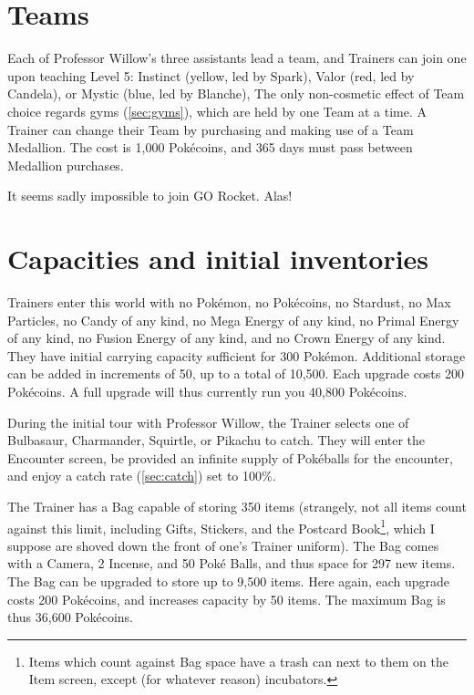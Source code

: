 \section{Teams}
Each of Professor Willow's three assistants lead a team, and Trainers can join one
 upon teaching Level 5: Instinct (yellow, led by Spark),
  Valor (red, led by Candela),
  or Mystic (blue, led by Blanche),
The only non-cosmetic effect of Team choice regards gyms (\autoref{sec:gyms}), which
  are held by one Team at a time.
A Trainer can change their Team by purchasing and making use of a Team Medallion.
The cost is 1,000 Pokécoins, and 365 days must pass between Medallion purchases.

It seems sadly impossible to join GO Rocket. Alas!

\section{Capacities and initial inventories\label{sec:capacities}}
Trainers enter this world with no Pokémon, no Pokécoins, no Stardust,
  no Max Particles, no Candy of any kind, no Mega Energy of any kind,
  no Primal Energy of any kind, no Fusion Energy of any kind, and no Crown
  Energy of any kind.
They have initial carrying capacity sufficient for 300 Pokémon.
Additional storage can be added in increments of 50, up to a total of 10,500.
Each upgrade costs 200 Pokécoins.
A full upgrade will thus currently run you 40,800 Pokécoins.

During the initial tour with Professor Willow, the Trainer selects one of
 Bulbasaur, Charmander, Squirtle, or Pikachu to catch.
They will enter the Encounter screen, be provided an infinite supply of
  Pokéballs for the encounter, and enjoy a catch rate (\autoref{sec:catch}) set to 100\%.

The Trainer has a Bag capable of storing 350 items (strangely, not all items
  count against this limit, including Gifts, Stickers, and the Postcard Book\footnote{Items which count against Bag space have a trash can next to them on the Item screen, except (for whatever reason) incubators.},
  which I suppose are shoved down the front of one's Trainer uniform).
The Bag comes with a Camera, 2 Incense, and 50 Poké Balls,
  and thus space for 297 new items.
The Bag can be upgraded to store up to 9,500 items.
Here again, each upgrade costs 200 Pokécoins, and increases capacity by 50 items.
The maximum Bag is thus 36,600 Pokécoins.

